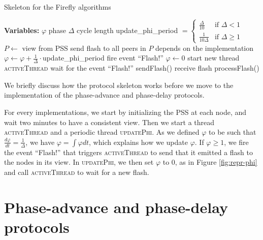 \documentclass[a4paper, 11pt]{article}
\renewcommand{\phi}{\varphi}
\theoremstyle{plain}
\theoremstyle{definition}
\begin{document}
  
   \begin{algorithm}
     \caption{Skeleton for the Firefly algorithms}
     \label{alg:firefly-skeleton}
     \begin{algorithmic}
       \State \textbf{Variables:}
       \State $\phi$ \Comment phase
       \State $\Delta$ \Comment cycle length 
       \State update\_phi\_period $= \begin{cases} \frac{\Delta}{10} & \text{if } \Delta < 1 \\
         \frac{1}{10\Delta} & \text{if } \Delta \geq 1 \end{cases}$
       \State
         \State $P \gets$ view from PSS
         \State send flash to all peers in $P$
       \EndFunction
       \State
         \State depends on the implementation
       \EndFunction
       \State
         \If{$\phi < 1$}
           \State $\phi \gets \phi + \frac{1}{\Delta} \cdot $update\_phi\_period
         \Else
           \State fire event ``Flash!''
           \State $\phi \gets 0$
           \State start new thread \textsc{activeThread}
         \EndIf
       \EndFunction
       \State
          \State wait for the event ``Flash!''
          \State sendFlash()
       \EndFunction
       \State
         \State receive flash
         \State processFlash()
       \EndFunction
     \end{algorithmic}
   \end{algorithm}


   We briefly discuss how the protocol skeleton works before we move to the implementation of the
   phase-advance and phase-delay protocols.

   For every implementations, we start by initializing the PSS at each node, and wait two minutes to have a
   consistent view. Then we start a thread \textsc{activeThread} and a periodic thread \textsc{updatePhi}. As
   we defined $\phi$ to be such that $\frac{d\phi}{dt} = \frac{1}{\Delta}$, we have $\phi = \int \phi dt$,
   which explains how we update $\phi$. If $\phi \geq 1$, we fire the event ``Flash!'' that triggers
   \textsc{activeThread} to send that it emitted a flash to the nodes in its view. In \textsc{updatePhi}, we
   then set $\phi$ to 0, as in Figure \ref{fig:repr-phi} and call \textsc{activeThread} to wait for a new
   flash.

   

\section{Phase-advance and phase-delay protocols}
\label{sec:phase-ad-phase-de}
\end{document}
